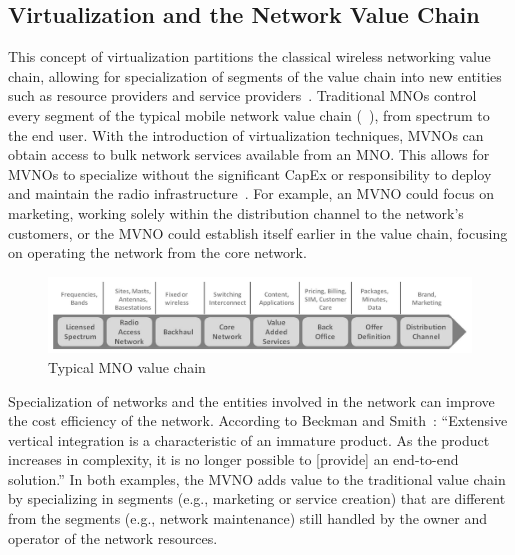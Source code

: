 \documentclass[12pt,dvipsnames]{report}
\begin{document}
\subsection{Virtualization and the Network Value Chain} \label{subsec:virtualization_valuechain}

This concept of virtualization partitions the classical wireless networking value chain, allowing for specialization of segments of the value chain into new entities such as resource providers and service providers~\cite{1421931}.  Traditional MNOs control every segment of the typical mobile network value chain (~\cite{6737248}), from spectrum to the end user.  With the introduction of virtualization techniques, MVNOs can obtain access to bulk network services available from an MNO.  This allows for MVNOs to specialize without the significant CapEx or responsibility to deploy and maintain the radio infrastructure~\cite{6737248}.  For example, an MVNO could focus on marketing, working solely within the distribution channel to the network's customers, or the MVNO could establish itself earlier in the value chain, focusing on operating the network from the core network.

\begin{figure}[ht]
	\centering
	\includegraphics[width=1\linewidth]{ClassicNetworkValueChain}
	\caption[Typical MNO value chain]{Typical MNO value chain~\cite{6737248}}
	\label{fig:ClassicNetworkValueChain}
\end{figure}

Specialization of networks and the entities involved in the network can improve the cost efficiency of the network.  According to Beckman and Smith~\cite{1421931}: ``Extensive vertical integration is a characteristic of an immature product.  As the product increases in complexity, it is no longer possible to [provide] an end-to-end solution.'' In both examples, the MVNO adds value to the traditional value chain by specializing in segments (e.g., marketing or service creation) that are different from the segments (e.g., network maintenance) still handled by the owner and operator of the network resources.
\end{document}
